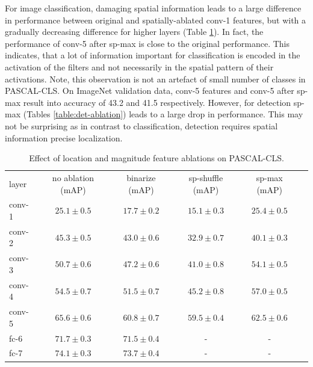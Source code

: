 For image classification, damaging spatial information leads to a large difference in performance between original and spatially-ablated conv-1 features, but with a gradually decreasing difference for higher layers (Table \ref{table:class-ablation}). 
In fact, the performance of conv-5 after sp-max is close to the original performance. 
This indicates, that a lot of information important for classification is encoded in the activation of the filters and not necessarily in the spatial pattern of their activations. %
Note, this observation is not an artefact of small number of classes in PASCAL-CLS. On ImageNet validation data, conv-5 features and conv-5 after sp-max result into accuracy of 43.2 and 41.5 respectively. 
However, for detection sp-max (Tables \ref{table:det-ablation}) leads to a large drop in performance. 
This may not be surprising as in contrast to classification, detection requires spatial information precise localization.

\setlength{\tabcolsep}{4pt}
\begin{table}[t!]
\begin{center}
\caption{Effect of location and magnitude feature ablations on PASCAL-CLS.}
\label{table:class-ablation}
\begin{tabular}{lccccc}
\noalign{\smallskip}
layer & no ablation (mAP) & binarize (mAP) & sp-shuffle (mAP) & sp-max (mAP) \\
\noalign{\smallskip}
\hline
\noalign{\smallskip}
conv-1 & $25.1 \pm 0.5$ & $17.7 \pm 0.2$ & $15.1 \pm 0.3$ & $25.4 \pm 0.5$  \\ 
conv-2 & $45.3 \pm 0.5$ & $43.0 \pm 0.6$ & $32.9 \pm 0.7$ & $40.1 \pm 0.3$  \\ 
conv-3 & $50.7 \pm 0.6$ & $47.2 \pm 0.6$ & $41.0 \pm 0.8$ & $54.1 \pm 0.5$  \\
conv-4 & $54.5 \pm 0.7$ & $51.5 \pm 0.7$ & $45.2 \pm 0.8$ & $57.0 \pm 0.5$  \\
conv-5 & $65.6 \pm 0.6$ & $60.8 \pm 0.7$ & $59.5 \pm 0.4$ & $62.5 \pm 0.6$  \\
fc-6   & $71.7 \pm 0.3$ & $71.5 \pm 0.4$ &  -             &  -   \\
fc-7   & $74.1 \pm 0.3$ & $73.7 \pm 0.4$ &  -             &  -   \\
\end{tabular}
\end{center}
\end{table}
\setlength{\tabcolsep}{1.4pt}

